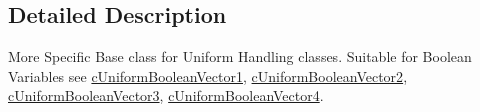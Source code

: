 \subsection{Detailed Description}
More Specific Base class for Uniform Handling classes. Suitable for Boolean Variables see \hyperlink{classc_uniform_boolean_vector1}{cUniformBooleanVector1}, \hyperlink{classc_uniform_boolean_vector2}{cUniformBooleanVector2}, \hyperlink{classc_uniform_boolean_vector3}{cUniformBooleanVector3}, \hyperlink{classc_uniform_boolean_vector4}{cUniformBooleanVector4}. 